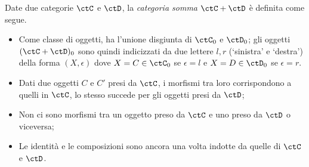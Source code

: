 \begin{definition}\label{def_cat_somma}
	Date due categorie \(\ctC\) e \(\ctD\), la \emph{categoria somma} \(\ctC+\ctD\) è definita come segue.
	\begin{itemize}
		\item Come classe di oggetti,  ha l'unione disgiunta di \(\ctC_0\) e \(\ctD_0\); gli oggetti \((\ctC+\ctD)_0\) sono quindi indicizzati da due lettere \(l,r\) (`sinistra' e `destra') della forma \((X,\epsilon)\) dove \(X=C\in\ctC_0\) se \(\epsilon = l\) e \(X=D\in\ctD_0\) se \(\epsilon=r\).
		\item Dati due oggetti \(C\) e \(C'\) presi da \(\ctC\), i morfismi tra loro corrispondono a quelli in \(\ctC\), lo stesso succede per gli oggetti presi da \(\ctD\);
		\item Non ci sono morfismi tra un oggetto preso da \(\ctC\) e uno preso da \(\ctD\) o viceversa;
		\item Le identità e le composizioni sono ancora una volta indotte da quelle di \(\ctC\) e \(\ctD\).
	\end{itemize}
\end{definition}

